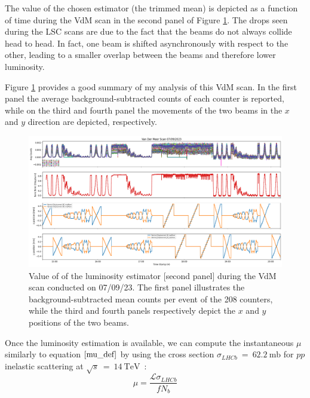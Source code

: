 The value of the chosen estimator (the trimmed mean) is depicted as a function of time during the VdM scan in the second panel of Figure \ref{fig:lumi_result_all}. The drops seen during the LSC scans are due to the fact that the beams do not always collide head to head. In fact, one beam is shifted asynchronously with respect to the other, leading to a smaller overlap between the beams and therefore lower luminosity. 

Figure \ref{fig:lumi_result_all} provides a good summary of my analysis of this VdM scan. In the first panel the average background-subtracted counts of each counter is reported, while on the third and fourth panel the movements of the two beams in the $x$ and $y$ direction are depicted, respectively.

\begin{figure}
    \centering
    \includegraphics[width=\textwidth]{figures/lumi_plot.png}
    \caption{Value of of the luminosity estimator [second panel] during the VdM scan conducted on 07/09/23.
The first panel illustrates the background-subtracted mean counts per event of the 208 counters, while the third and fourth
panels respectively depict the $x$ and $y$ positions of the two beams.}
    \label{fig:lumi_result_all}
\end{figure}

Once the luminosity estimation is available, we can compute the instantaneous $\mu$ similarly to equation $\eqref{mu_def}$ by using the cross section $\sigma_{LHCb}~=~\SI{62.2}{\milli\barn}$ for $pp$ inelastic scattering at $\sqrt{s}~=~\SI{14}{\tera\eV}$~\cite{Aaij:2310870}:
\begin{equation}
    \mu = \frac{\mathcal{L}\sigma_{LHCb}}{f N_b}\label{inst_mu}
\end{equation}




